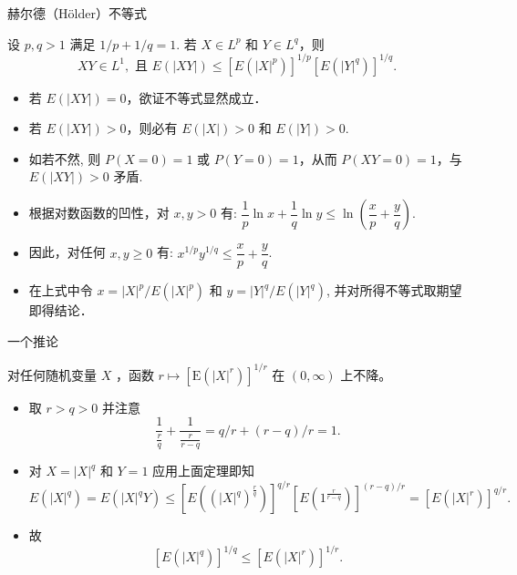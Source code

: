 \documentclass[Prob-All.tex]{subfiles}
\begin{document}
\begin{frame}{赫尔德（H{\"o}lder）不等式}
\begin{thm}
设 $p, q>1$ 满足 $1 / p+1 / q=1$. 若 $X \in L^{p}$ 和 $Y \in L^{q}$，则
$$
X Y \in L^{1}, \mbox{ 且 } E(|X Y|) \leqslant\left[E\left(|X|^{p}\right)\right]^{1 / p}\left[E\left(|Y|^{q}\right)\right]^{1 / q}.$$
\end{thm}

\pause

\zheng
\begin{itemize}[<+-|alert@+>]
\item 若 $E(|X Y|)=0$，欲证不等式显然成立．
\item 若 $E(|X Y|)>0$，则必有 $E(|X|)>0$ 和 $E(|Y|)>0$.
\item 如若不然, 则 $P(X=0)=1$ 或 $P(Y=0)=1$，从而 $P(X Y=0)=1$，与 $E(|X Y|)>0$ 矛盾.
\item 根据对数函数的凹性，对 $x, y>0$ 有: $\dfrac{1}{p} \ln x+\dfrac{1}{q} \ln y \leqslant \ln \left(\dfrac{x}{p}+\dfrac{y}{q}\right).$
\item 因此，对任何 $x, y \geqslant 0$ 有: $x^{1 / p} y^{1 / q} \leqslant \dfrac{x}{p}+\dfrac{y}{q}$.
\item 在上式中令 $x=|X|^{p} / E\left(|X|^{p}\right)$ 和 $y=|Y|^{q} / E\left(|Y|^{q}\right)$, 并对所得不等式取期望即得结论．
\end{itemize}

\end{frame}


\begin{frame}{一个推论}
\begin{prop}
对任何随机变量 $X$ ，函数 $r \mapsto\left[\mathrm{E}\left(|X|^{r}\right)\right]^{1 / r}$ 在 $(0, \infty)$ 上不降。
\end{prop}
\pause

\zheng

\begin{itemize}[<+-|alert@+>]
\item 取 $r>q>0$ 并注意
$$\dfrac{1}{\frac{r}{q}}+\dfrac{1}{\frac{r}{r-q}}=q / r+(r-q) / r=1.$$
\item 对 $X=|X|^{q}$ 和 $Y=1$ 应用上面定理即知
$$E\left(|X|^{q}\right)=E(|X|^{q} Y) \leqslant\left[E\left((|X|^q)^{\frac{r}{q}}\right)\right]^{q / r}\left[E\left(1^{\frac{r}{r-q}}\right)\right]^{(r-q) / r}=\left[E\left(|X|^{r}\right)\right]^{q / r}.$$
\item 故
$$\left[E\left(|X|^{q}\right)\right]^{1 / q} \leqslant\left[E\left(|X|^{r}\right)\right]^{1 / r}.$$
\end{itemize}

\end{frame}
\end{document}

